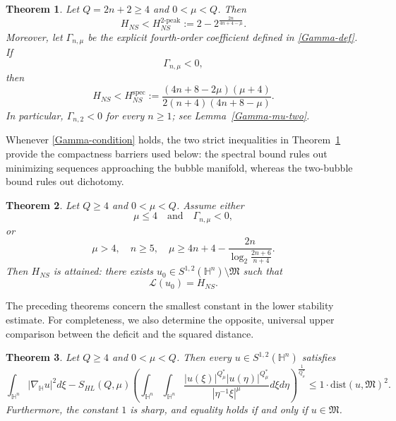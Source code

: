 \documentclass[10pt,a4paper]{amsart}
\newtheorem{theorem}{Theorem}[section]
\begin{document}
\begin{theorem}\label{main thm0}
\begingroup
Let $Q=2n+2\ge4$ and $0<\mu<Q$. Then
\begin{equation}\label{upper2}
H_{NS}<H_{NS}^{2\text{-peak}}
:=2-2^{\frac{2n}{4n+4-\mu}}.
\end{equation}
Moreover, let $\Gamma_{n,\mu}$ be the explicit fourth-order coefficient defined in \eqref{Gamma-def}. If
\begin{equation}\label{Gamma-condition}
\Gamma_{n,\mu}<0,
\end{equation}
then
\begin{equation}\label{upper1}
H_{NS}<H_{NS}^{\mathrm{spec}}
:=\frac{(4n+8-2\mu)(\mu+4)}{2(n+4)(4n+8-\mu)}.
\end{equation}
In particular, $\Gamma_{n,2}<0$ for every $n\ge1$; see Lemma~\ref{Gamma-mu-two}.
\endgroup
\end{theorem}




Whenever \eqref{Gamma-condition} holds, the two strict inequalities in Theorem~\ref{main thm0} provide the compactness barriers used below: the spectral bound rules out minimizing sequences approaching the bubble manifold, whereas the two-bubble bound rules out dichotomy.


\begin{theorem}\label{main thm1}
\begingroup
Let \(Q\ge4\) and \(0<\mu<Q\). Assume either
\[
\mu\le4\quad\text{and}\quad \Gamma_{n,\mu}<0,
\]
or
\begin{equation}\label{ach}
\mu>4,\quad n\ge5,\quad
\mu \ge 4n+4-\frac{2n}{\log_2\frac{2n+6}{n+4}}.
\end{equation}
Then \(H_{NS}\) is attained: there exists
\(u_0\in S^{1,2}(\mathbb{H}^n)\setminus\mathfrak M\) such that
\[
\mathcal L(u_0)=H_{NS}.
\]
\endgroup
\end{theorem}



The preceding theorems concern the smallest constant in the lower stability estimate. For completeness, we also determine the opposite, universal upper comparison between the deficit and the squared distance.
\begin{theorem}\label{main thm2}
Let $Q\geq 4$ and $0<\mu<Q$. {Then every $u\in S^{1,2}(\mathbb{H}^{n})$ satisfies}
\begin{equation}\label{ub1}
 \int_{\mathbb{H}^{n}}|\nabla_{\mathbb{H}} u|^{2}{d}\xi-S_{HL}(Q,\mu) \left(\int_{\mathbb{H}^{n}}\int_{\mathbb{H}^{n}}\frac{|u(\xi)|^{Q^{\ast}_{\mu}}|u(\eta)|
^{Q^{\ast}_{\mu}}}{|\eta^{-1}\xi|^{\mu}}{d}\xi{d}\eta\right)^{\frac{1}{Q^{\ast}_{\mu}}}\leq 1\cdot \mathrm{dist}(u,\mathfrak{M})^2.
\end{equation}
Furthermore, the constant $1$ is sharp, and equality holds if and only if $u\in \mathfrak{M}$.
\end{theorem}
\end{document}
